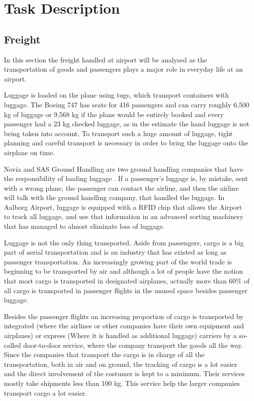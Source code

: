 \section{Task Description}
\subsection{Freight}
In this section the freight handled at airport will be analysed as the transportation of goods and passengers plays a major role in everyday life at an airport. 

Luggage is loaded on the plane using tugs, which transport containers with luggage. The Boeing 747 has seats for 416 passengers\cite{freight_boing} and can carry roughly 6,500 kg of luggage or 9,568 kg if the plane would be entirely booked and every passenger had a 23 kg checked luggage, as in the estimate the hand luggage is not being taken into account. To transport such a huge amount of luggage, tight planning and careful transport is necessary in order to bring the luggage onto the airplane on time.

Novia and SAS Ground Handling are two ground handling companies that have the responsibility of loading luggage \cite{mistet_bagage}. If a passenger's luggage is, by mistake, sent with a wrong plane, the passenger can contact the airline, and then the airline will talk with the ground handling company, that handled the luggage. In Aalborg Airport, luggage is equipped with a RFID chip that allows the Airport to track all luggage, and use that information in an advanced sorting machinery that has managed to almost eliminate loss of luggage.


Luggage is not the only thing transported. Aside from passengers, cargo is a big part of aerial transportation and is an industry that has existed as long as passenger transportation. An increasingly growing part of the world trade is beginning to be transported by air and although a lot of people have the notion that most cargo is transported in designated airplanes, actually more than 60\% of all cargo is transported in passenger flights in the unused space besides passenger luggage. %


Besides the passenger flights an increasing proportion of cargo is transported by integrated (where the airlines or other companies have their own equipment and airplanes) or express (Where it is handled as additional luggage) 
carriers by a so-called door-to-door service, where the company transport the goods all the way. Since the companies that transport the cargo is in charge of all the transportation, both in air and on ground, the tracking of cargo is a lot easier and the direct involvement of the costumer is kept to a minimum. Their services mostly take shipments less than 100 kg. This service help the larger companies transport cargo a lot easier.


